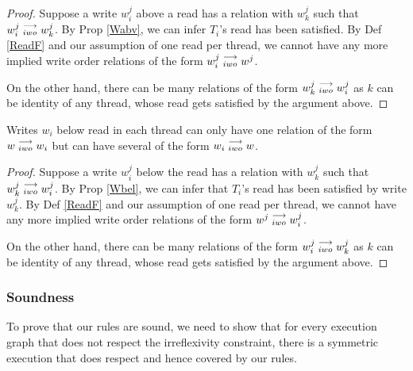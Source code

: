     \begin{proof}
        Suppose a write $w_i^j$ above a read has a relation with $w_k^j$ such that $w_i^j\stackrel{\longrightarrow}{_{iwo}}w_k^j$. By Prop \ref{Wabv}, we can infer $T_i$'s read has been satisfied. By Def \ref{ReadF} and our assumption of one read per thread, we cannot have any more implied write order relations of the form $w_i^j\stackrel{\longrightarrow}{_{iwo}}w^j$. 

        On the other hand, there can be many relations of the form $w_k^j\stackrel{\longrightarrow}{_{iwo}}w_i^j$ as $k$ can be identity of any thread, whose read gets satisfied by the argument above.
    \end{proof}

   
    \begin{property}
        \label{prop8}
        Writes $w_i$ below read in each thread can only have one relation of the form $w\stackrel{\longrightarrow}{_{iwo}}w_i$ but can have several of the form $w_i\stackrel{\longrightarrow}{_{iwo}}w$. 
    \end{property}

    \begin{proof}
        Suppose a write $w_i^j$ below the read has a relation with $w_k^j$ such that $w_k^j\stackrel{\longrightarrow}{_{iwo}}w_i^j$. By Prop \ref{Wbel}, we can infer that $T_i$'s read has been satisfied by write $w_k^j$. By Def \ref{ReadF} and our assumption of one read per thread, we cannot have any more implied write order relations of the form $w^j\stackrel{\longrightarrow}{_{iwo}}w_i^j$. 

        On the other hand, there can be many relations of the form $w_i^j\stackrel{\longrightarrow}{_{iwo}}w_k^j$ as $k$ can be identity of any thread, whose read gets satisfied by the argument above.  
    \end{proof}


    \subsubsection{Soundness}

        To prove that our rules are sound, we need to show that for every execution graph that does not respect the irreflexivity constraint, there is a symmetric execution that does respect and hence covered by our rules. 
        
